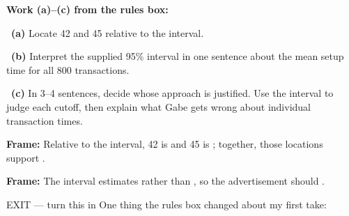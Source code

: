 \documentclass[11pt]{article}
\begin{document}
\newpage
\textbf{Work (a)--(c) from the rules box:}\par\smallskip

~\textbf{(a)} Locate 42 and 45 relative to the interval.\par
\workspace{0.7in}

~\textbf{(b)} Interpret the supplied 95\% interval in one sentence about the mean setup time for all 800 transactions.\par
\workspace{1.4in}

~\textbf{(c)} In 3--4 sentences, decide whose approach is justified. Use the interval to judge each cutoff, then explain what Gabe gets wrong about individual transaction times.\par
\workspace{2.0in}

\begin{sentenceframebox}\raggedright\textbf{Frame:} Relative to the interval, 42 is \blank[1.0in] and 45 is \blank[1.0in]; together, those locations support \blank[2.5in].\end{sentenceframebox}

\begin{sentenceframebox}\raggedright\textbf{Frame:} The interval estimates \blank[2.0in] rather than \blank[1.9in], so the advertisement should \blank[2.0in].\end{sentenceframebox}

\begin{summaryexitbox}{EXIT --- turn this in}
One thing the rules box changed about my first take: \hrulefill\par
\workspace{0.4in}
\end{summaryexitbox}
\end{document}
